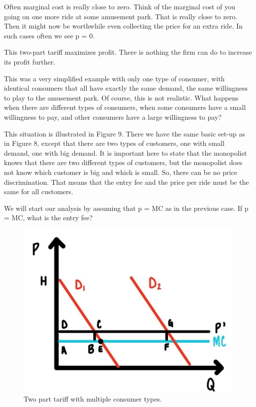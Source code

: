 \documentclass[
]{book}
\begin{document}
Often marginal cost is really close to zero. Think of the marginal cost of you going on one more ride at some amusement park. That is really close to zero. Then it might now be worthwhile even collecting the price for an extra ride. In such cases often we see p = 0.

This two-part tariff maximizes profit. There is nothing the firm can do to increase its profit further.

This was a very simplified example with only one type of consumer, with identical consumers that all have exactly the same demand, the same willingness to play to the amusement park. Of course, this is not realistic. What happens when there are different types of consumers, when some consumers have a small willingness to pay, and other consumers have a large willingness to pay?

This situation is illustrated in Figure 9. There we have the same basic set-up as in Figure 8, except that there are two types of customers, one with small demand, one with big demand. It is important here to state that the monopolist knows that there are two different types of customers, but the monopolist does not know which customer is big and which is small. So, there can be no price discrimination. That means that the entry fee and the price per ride must be the same for all customers.

We will start our analysis by assuming that p = MC as in the previous case. If p = MC, what is the entry fee?

\begin{figure}

{\centering \includegraphics[width=0.75\linewidth]{img/ch6/fig10} 

}

\caption{Two part tariff with multiple consumer types.}\label{fig:fig610}
\end{figure}
\end{document}
